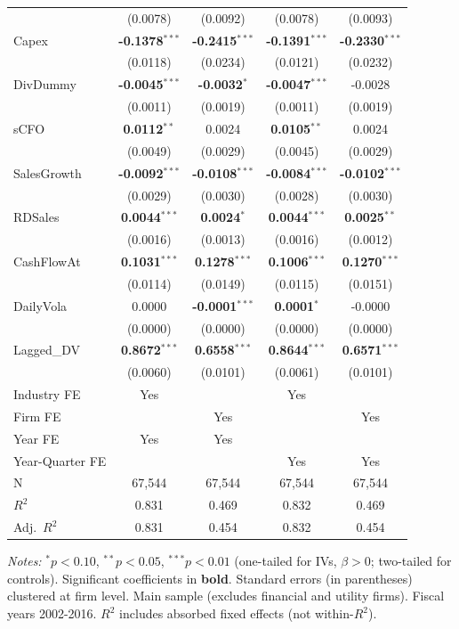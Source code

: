 \documentclass[11pt,a4paper]{article}
\begin{document}
\begin{table}[htbp]
\begin{tabular}{lcccc}
 & (0.0078) & (0.0092) & (0.0078) & (0.0093) \\
Capex & \textbf{-0.1378}$^{***}$ & \textbf{-0.2415}$^{***}$ & \textbf{-0.1391}$^{***}$ & \textbf{-0.2330}$^{***}$ \\
 & (0.0118) & (0.0234) & (0.0121) & (0.0232) \\
DivDummy & \textbf{-0.0045}$^{***}$ & \textbf{-0.0032}$^{*}$ & \textbf{-0.0047}$^{***}$ & -0.0028 \\
 & (0.0011) & (0.0019) & (0.0011) & (0.0019) \\
sCFO & \textbf{0.0112}$^{**}$ & 0.0024 & \textbf{0.0105}$^{**}$ & 0.0024 \\
 & (0.0049) & (0.0029) & (0.0045) & (0.0029) \\
SalesGrowth & \textbf{-0.0092}$^{***}$ & \textbf{-0.0108}$^{***}$ & \textbf{-0.0084}$^{***}$ & \textbf{-0.0102}$^{***}$ \\
 & (0.0029) & (0.0030) & (0.0028) & (0.0030) \\
RDSales & \textbf{0.0044}$^{***}$ & \textbf{0.0024}$^{*}$ & \textbf{0.0044}$^{***}$ & \textbf{0.0025}$^{**}$ \\
 & (0.0016) & (0.0013) & (0.0016) & (0.0012) \\
CashFlowAt & \textbf{0.1031}$^{***}$ & \textbf{0.1278}$^{***}$ & \textbf{0.1006}$^{***}$ & \textbf{0.1270}$^{***}$ \\
 & (0.0114) & (0.0149) & (0.0115) & (0.0151) \\
DailyVola & 0.0000 & \textbf{-0.0001}$^{***}$ & \textbf{0.0001}$^{*}$ & -0.0000 \\
 & (0.0000) & (0.0000) & (0.0000) & (0.0000) \\
Lagged\_DV & \textbf{0.8672}$^{***}$ & \textbf{0.6558}$^{***}$ & \textbf{0.8644}$^{***}$ & \textbf{0.6571}$^{***}$ \\
 & (0.0060) & (0.0101) & (0.0061) & (0.0101) \\
\midrule
Industry FE & Yes &  & Yes &  \\
Firm FE &  & Yes &  & Yes \\
Year FE & Yes & Yes &  &  \\
Year-Quarter FE &  &  & Yes & Yes \\
\midrule
N & 67,544 & 67,544 & 67,544 & 67,544 \\
$R^2$ & 0.831 & 0.469 & 0.832 & 0.469 \\
Adj.~$R^2$ & 0.831 & 0.454 & 0.832 & 0.454 \\
\bottomrule
\end{tabular}
\begin{minipage}{\linewidth}
\vspace{2pt}\scriptsize
\textit{Notes:} $^{*}p<0.10$, $^{**}p<0.05$, $^{***}p<0.01$ (one-tailed for IVs, $\beta > 0$; two-tailed for controls).
 Significant coefficients in \textbf{bold}.
 Standard errors (in parentheses) clustered at firm level.
 Main sample (excludes financial and utility firms). Fiscal years 2002-2016.
 $R^2$ includes absorbed fixed effects (not within-$R^2$).
\end{minipage}
\end{table}
\end{document}
